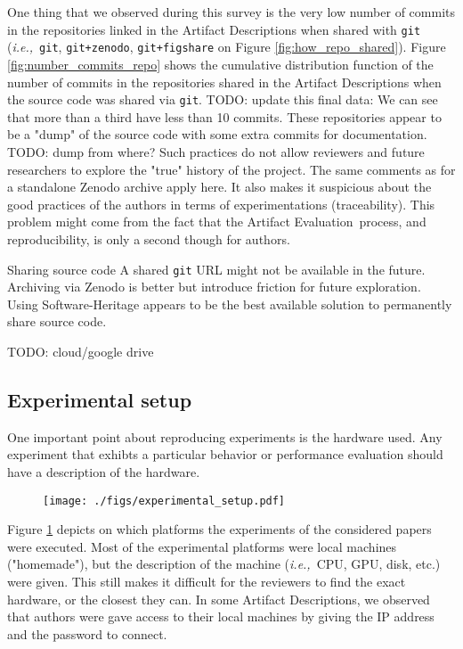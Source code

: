 \documentclass[sigconf]{acmart}
\newcommand{\ie}{\emph{i.e.,}}
\newcommand{\ad}{Artifact Description}
\newcommand{\aeval}{Artifact Evaluation}
\newcommand{\todo}[1]{{\color{red}TODO: #1}}
\begin{document}
One thing that we observed during this survey is the very low number of commits in the repositories linked in the \ad s when shared with \texttt{git} (\ie\ \texttt{git}, \texttt{git+zenodo}, \texttt{git+figshare} on Figure \ref{fig:how_repo_shared}).
Figure \ref{fig:number_commits_repo} shows the cumulative distribution function of the number of commits in the repositories shared in the \ad s when the source code was shared via \texttt{git}.
\todo{update this final data: We can see that more than a third have less than 10 commits.}
These repositories appear to be a "dump" of the source code with some extra commits for documentation.
\todo{dump from where?}
Such practices do not allow reviewers and future researchers to explore the "true" history of the project.
The same comments as for a standalone Zenodo archive apply here.
It also makes it suspicious about the good practices of the authors in terms of experimentations (traceability).
This problem might come from the fact that the \aeval\ process, and reproducibility, is only a second though for authors.

\begin{lesson}{Sharing source code}{}
  A shared \texttt{git} URL might not be available in the future.
  Archiving via Zenodo is better but introduce friction for future exploration.
  Using Software-Heritage appears to be the best available solution to permanently share source code.
\end{lesson}

\todo{cloud/google drive}

\subsection{Experimental setup}\label{sec:sop:expe}

One important point about reproducing experiments is the hardware used.
Any experiment that exhibts a particular behavior or performance evaluation should have a description of the hardware. 

\begin{figure}
  \centering
  \texttt{[image: ./figs/experimental\_setup.pdf]}
  \caption{}\label{fig:experimental_setup}
\end{figure}

Figure \ref{fig:experimental_setup} depicts on which platforms the experiments of the considered papers were executed.
Most of the experimental platforms were local machines ("homemade"), but the description of the machine (\ie\ CPU, GPU, disk, etc.) were given.
This still makes it difficult for the reviewers to find the exact hardware, or the closest they can.
In some \ad s, we observed that authors were gave access to their local machines by giving the IP address and the password to connect.
\end{document}
